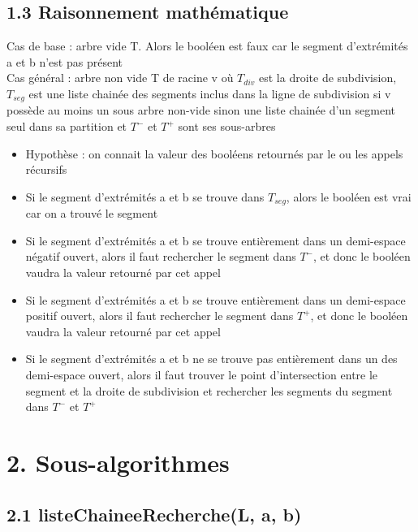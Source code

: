 \documentclass[a4paper,12pt]{report}	%
\begin{document}
	{\subsection*{1.3 Raisonnement mathématique}}
	
\noindent 
Cas de base : arbre vide T. Alors le booléen est faux car le segment d'extrémités a et b n'est pas présent\\
Cas général : arbre non vide T de racine v où $T_{div}$ est la droite de subdivision, $T_{seg}$ est une liste chainée des segments inclus dans la ligne de subdivision si v possède au moins un sous arbre non-vide sinon une liste chainée d'un segment seul dans sa partition et $T^{-}$ et $T^{+}$ sont ses sous-arbres
\begin{itemize}
\item Hypothèse : on connait la valeur des booléens retournés par le ou les appels récursifs
\item Si le segment d'extrémités a et b se trouve dans $T_{seg}$, alors le booléen est vrai car on a trouvé le segment
\item Si le segment d'extrémités a et b se trouve entièrement dans un demi-espace négatif ouvert, alors il faut rechercher le segment dans $T^{-}$, et donc le booléen vaudra la valeur retourné par cet appel
\item Si le segment d'extrémités a et b se trouve entièrement dans un demi-espace positif ouvert, alors il faut rechercher le segment dans $T^{+}$, et donc le booléen vaudra la valeur retourné par cet appel
\item Si le segment d'extrémités a et b ne se trouve pas entièrement dans un des demi-espace ouvert, alors il faut trouver le point d'intersection entre le segment et la droite de subdivision et rechercher les segments du segment dans $T^{-}$ et $T^{+}$
\end{itemize}

	
	\newpage

	{\section*{2. Sous-algorithmes}}
	
	{\subsection*{2.1 listeChaineeRecherche(L, a, b)}}
	
\end{document}
